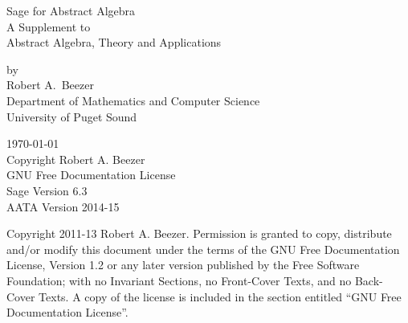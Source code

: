 \documentclass[12pt,oneside]{book}
\begin{document}
\thispagestyle{empty}
\begin{center}
{\fontsize{24}{24}\selectfont%
Sage for Abstract Algebra\\[24pt]
A Supplement to\\[6pt]
Abstract Algebra, Theory and Applications}
\par
{}
%
{\large by\\Robert A.\ Beezer\\Department of Mathematics and Computer Science\\University of Puget Sound}\par
%
%
%
\today\\
Copyright Robert A. Beezer\\
GNU Free Documentation License\\[12pt]
Sage Version 6.3\\
AATA Version 2014-15
%
\end{center}
\newpage
\thispagestyle{empty}
\noindent
Copyright 2011-13 Robert A. Beezer. Permission is granted to copy, distribute
and/or modify this document under the terms of the GNU Free
Documentation License, Version 1.2 or any later version published by the
Free Software Foundation; with no Invariant Sections, no Front-Cover
Texts, and no Back-Cover Texts. A copy of the license is included in the
section entitled ``GNU Free Documentation License''.
\par
{}
\newpage
\thispagestyle{empty}
\tableofcontents
\newpage
\thispagestyle{empty}
\end{document}
